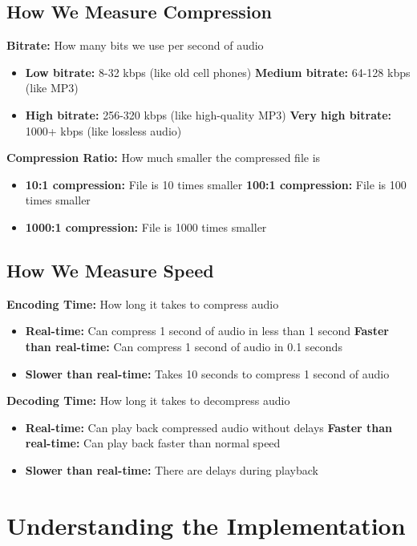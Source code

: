 \documentclass[12pt]{article}
\begin{document}
\subsection{How We Measure Compression}

\textbf{Bitrate:} How many bits we use per second of audio
\begin{itemize}
    \item \textbf{Low bitrate:} 8-32 kbps (like old cell phones)
    \textbf{Medium bitrate:} 64-128 kbps (like MP3)
    \item \textbf{High bitrate:} 256-320 kbps (like high-quality MP3)
    \textbf{Very high bitrate:} 1000+ kbps (like lossless audio)
\end{itemize}

\textbf{Compression Ratio:} How much smaller the compressed file is
\begin{itemize}
    \item \textbf{10:1 compression:} File is 10 times smaller
    \textbf{100:1 compression:} File is 100 times smaller
    \item \textbf{1000:1 compression:} File is 1000 times smaller
\end{itemize}

\subsection{How We Measure Speed}

\textbf{Encoding Time:} How long it takes to compress audio
\begin{itemize}
    \item \textbf{Real-time:} Can compress 1 second of audio in less than 1 second
    \textbf{Faster than real-time:} Can compress 1 second of audio in 0.1 seconds
    \item \textbf{Slower than real-time:} Takes 10 seconds to compress 1 second of audio
\end{itemize}

\textbf{Decoding Time:} How long it takes to decompress audio
\begin{itemize}
    \item \textbf{Real-time:} Can play back compressed audio without delays
    \textbf{Faster than real-time:} Can play back faster than normal speed
    \item \textbf{Slower than real-time:} There are delays during playback
\end{itemize}

\section{Understanding the Implementation}
\end{document}
